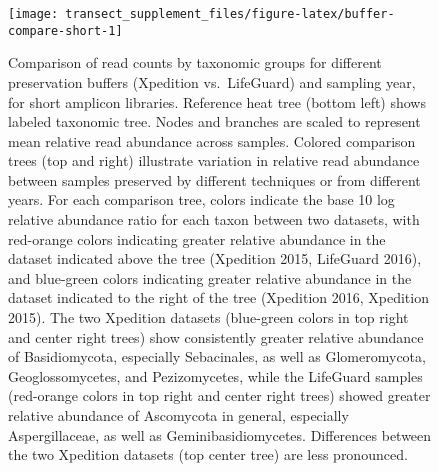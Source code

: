 \documentclass[
]{article}
\begin{document}
\begin{figure}

{\centering \texttt{[image: transect\_supplement\_files/figure-latex/buffer-compare-short-1]} 

}

\caption[Comparison of read counts by taxonomic groups for different preservation buffers (Xpedition vs.~LifeGuard) and sampling year, for short amplicon libraries]{Comparison of read counts by taxonomic groups for different preservation buffers (Xpedition vs.~LifeGuard) and sampling year, for short amplicon libraries. Reference heat tree (bottom left) shows labeled taxonomic tree.
Nodes and branches are scaled to represent mean relative read abundance across samples.
Colored comparison trees (top and right) illustrate variation in relative read abundance between samples preserved by different techniques or from different years.
For each comparison tree, colors indicate the base 10 log relative abundance ratio for each taxon between two datasets, with red-orange colors indicating greater relative abundance in the dataset indicated above the tree (Xpedition 2015, LifeGuard 2016), and blue-green colors indicating greater relative abundance in the dataset indicated to the right of the tree (Xpedition 2016, Xpedition 2015).
The two Xpedition datasets (blue-green colors in top right and center right trees) show consistently greater relative abundance of Basidiomycota, especially Sebacinales, as well as Glomeromycota, Geoglossomycetes, and Pezizomycetes,
while the LifeGuard samples (red-orange colors in top right and center right trees) showed greater relative abundance of Ascomycota in general, especially Aspergillaceae, as well as Geminibasidiomycetes.
Differences between the two Xpedition datasets (top center tree) are less pronounced.}\label{fig:buffer-compare-short}
\end{figure}
\end{document}

